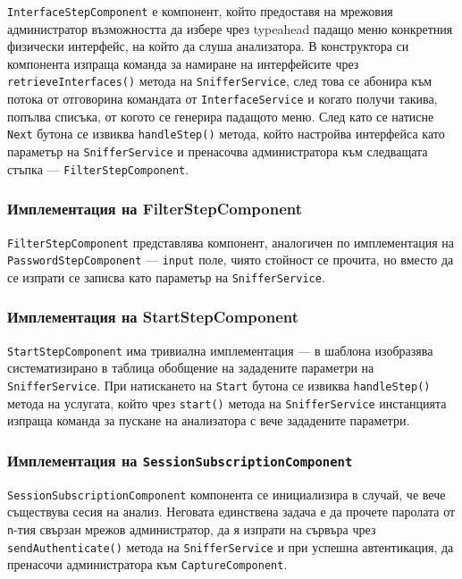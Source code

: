 \documentclass[12pt,a4paper,oneside]{book}
\begin{document}
\texttt{InterfaceStepComponent} е компонент, който предоставя на мрежовия
администратор възможността да избере чрез typeahead падащо меню конкретния
физически интерфейс, на който да слуша анализатора. В конструктора си компонента
изпраща команда за намиране на интерфейсите чрез \texttt{retrieveInterfaces()}
метода на \texttt{SnifferService}, след това се абонира към потока от отговорина
командата от \texttt{InterfaceService} и когато получи такива, попълва списъка,
от когото се генерира падащото меню. След като се натисне \texttt{Next} бутона
се извиква \texttt{handleStep()} метода, който настройва интерфейса като
параметър на \texttt{SnifferService} и пренасочва администратора към следващата
стъпка --- \texttt{FilterStepComponent}.

\subsubsection{Имплементация на FilterStepComponent}

\texttt{FilterStepComponent} представлява компонент, аналогичен по имплементация на
\texttt{PasswordStepComponent} --- \texttt{input} поле, чиято стойност се
прочита, но вместо да се изпрати се записва като параметър на \texttt{SnifferService}.

\subsubsection{Имплементация на StartStepComponent}

\texttt{StartStepComponent} има тривиална имплементация ---
в шаблона изобразява
систематизирано в таблица обобщение на зададените параметри на
\texttt{SnifferService}. При натискането на \texttt{Start} бутона се извиква
\texttt{handleStep()} метода на услугата, който чрез \texttt{start()}
метода на \texttt{SnifferService} инстанцията изпраща команда за пускане
на анализатора с вече зададените параметри.

\subsubsection{Имплементация на \texttt{SessionSubscriptionComponent}}

\texttt{SessionSubscriptionComponent} компонента се инициализира в случай, че
вече съществува сесия на анализ. Неговата единствена задача е да прочете
паролата от \texttt{n}-тия свързан мрежов администратор, да я изпрати на сървъра
чрез \texttt{sendAuthenticate()} метода на \texttt{SnifferService} и при успешна
автентикация, да пренасочи администратора към \texttt{CaptureComponent}.
\end{document}
